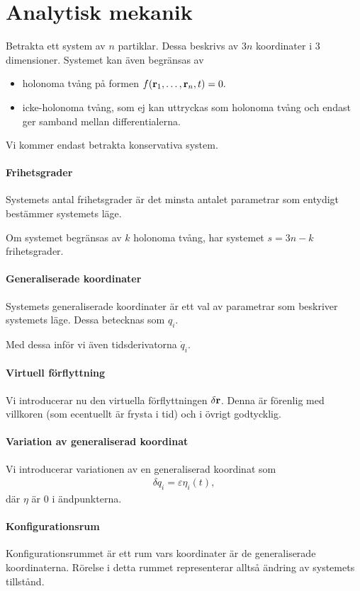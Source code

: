 \section{Analytisk mekanik}
Betrakta ett system av $n$ partiklar. Dessa beskrivs av $3n$ koordinater i $3$ dimensioner. Systemet kan även begränsas av
\begin{itemize}
	\item holonoma tvång på formen $f(\vb{r}_{1}, \dots, \vb{r}_{n}, t) = 0.$
	\item icke-holonoma tvång, som ej kan uttryckas som holonoma tvång och endast ger samband mellan differentialerna.
\end{itemize}
Vi kommer endast betrakta konservativa system.

\paragraph{Frihetsgrader}
Systemets antal frihetsgrader är det minsta antalet parametrar som entydigt bestämmer systemets läge.

Om systemet begränsas av $k$ holonoma tvång, har systemet $s = 3n - k$ frihetsgrader.

\paragraph{Generaliserade koordinater}
Systemets generaliserade koordinater är ett val av parametrar som beskriver systemets läge. Dessa betecknas som $q_{i}$.

Med dessa inför vi även tidsderivatorna $\dot{q}_{i}$.

\paragraph{Virtuell förflyttning}
Vi introducerar nu den virtuella förflyttningen $\delta\vb{r}$. Denna är förenlig med villkoren (som ecentuellt är frysta i tid) och i övrigt godtycklig.

\paragraph{Variation av generaliserad koordinat}
Vi introducerar variationen av en generaliserad koordinat som
\begin{align*}
	\delta q_{i} = \varepsilon\eta_{i}(t),
\end{align*}
där $\eta$ är $0$ i ändpunkterna.

\paragraph{Konfigurationsrum}
Konfigurationsrummet är ett rum vars koordinater är de generaliserade koordinaterna. Rörelse i detta rummet representerar alltså ändring av systemets tillstånd.

